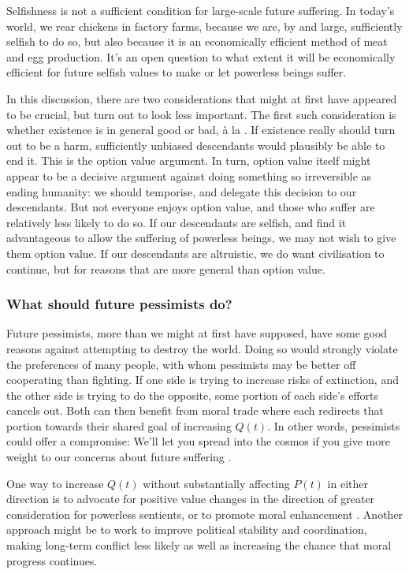 \documentclass[british]{article}
\begin{document}
Selfishness is not a sufficient condition for large-scale future suffering. In today's world, we rear chickens in factory farms, because we are, by and large, sufficiently selfish to do so, but also because it is an economically efficient method of meat and egg production. It's an open question to what extent it will be economically efficient for future selfish values to make or let powerless beings suffer.

In this discussion, there are two considerations that might at first have appeared to be crucial, but turn out to look less important. The first such consideration is whether existence is in general good or bad, à la \cite{benatar_better_2008}. If existence really should turn out to be a harm, sufficiently unbiased descendants would plausibly be able to end it. This is the option value argument. In turn, option value itself might appear to be a decisive argument against doing something so irreversible as ending humanity: we should temporise, and delegate this decision to our descendants. But not everyone enjoys option value, and those who suffer are relatively less likely to do so. If our descendants are selfish, and find it advantageous to allow the suffering of powerless beings, we may not wish to give them option value. If our descendants are altruistic, we do want civilisation to continue, but for reasons that are more general than option value.

\subsubsection{What should future pessimists do?}
Future pessimists, more than we might at first have supposed, have some good reasons against attempting to destroy the world. Doing so would strongly violate the preferences of many people, with whom pessimists may be better off cooperating than fighting. If one side is trying to increase risks of extinction, and the other side is trying to do the opposite, some portion of each side's efforts cancels out. Both can then benefit from moral trade where each redirects that portion towards their shared goal of increasing $Q(t)$. In other words, pessimists could offer a compromise: We'll let you spread into the cosmos if you give more weight to our concerns about future suffering \citep{tomasik_gains_2013}.

One way to increase $Q(t)$ without substantially affecting $P(t)$ in either direction is to advocate for positive value changes in the direction of greater consideration for powerless sentients, or to promote moral enhancement \citep{persson_perils_2008}. Another approach might be to work to improve political stability and coordination, making long-term conflict less likely as well as increasing the chance that moral progress continues.
\end{document}
